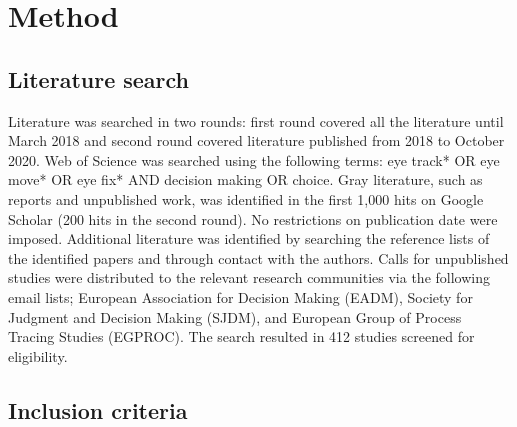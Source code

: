 
\section{Method}


\subsection{Literature search}

Literature was searched in two rounds: first round covered all the literature until March 2018 and second round covered literature published from 2018 to October 2020. Web of Science was searched using the following terms: eye track* OR eye move* OR eye fix* AND decision making OR choice. Gray literature, such as reports and unpublished work, was identified in the first 1,000 hits on Google Scholar (200 hits in the second round). No restrictions on publication date were imposed. Additional literature was identified by searching the reference lists of the identified papers and through contact with the authors. Calls for unpublished studies were distributed to the relevant research communities via the following email lists; European Association for Decision Making (EADM), Society for Judgment and Decision Making (SJDM), and European Group of Process Tracing Studies (EGPROC). The search resulted in 412 studies screened for eligibility.


\subsection{Inclusion criteria}

